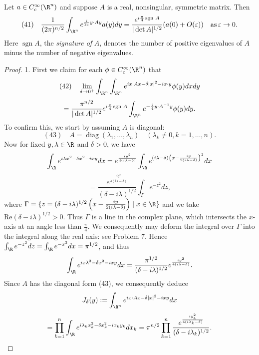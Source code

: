 \begin{lemma}
\label{lem:stationary-phase-quadratic-asymptotics}
Let $a \in C_c^\infty(\R^n)$ and suppose $A$ is a real, nonsingular, symmetric matrix. Then
$$(41) \quad \frac{1}{(2\pi)^{n/2}} \int_{\R^n} e^{\frac{i}{2\varepsilon}y \cdot A y} a(y) dy = \frac{e^{i\frac{\pi}{4}\operatorname{sgn}\,A}}{|\det A|^{1/2}} (a(0) + O(\varepsilon)) \quad \text{as}\, \varepsilon \to 0.$$
Here $\operatorname{sgn} A$, the \textit{signature of} $A$, denotes the number of positive eigenvalues of $A$ minus the number of negative eigenvalues.
\end{lemma}
\begin{proof}
1. First we claim for each $\phi \in C_c^\infty(\R^n)$ that
$$(42) \quad \lim_{\delta \to 0^+} \int_{\R^n} \int_{\R^n} e^{ix \cdot Ax - \delta|x|^2 - i x \cdot y} \phi(y) dx dy$$
$$= \frac{\pi^{n/2}}{|\det A|^{1/2}} e^{i\frac{\pi}{4}\operatorname{sgn}\,A} \int_{\R^n} e^{-\frac{i}{4}y \cdot A^{-1} y} \phi(y) dy.$$
To confirm this, we start by assuming $A$ is diagonal:
$$(43) \quad A = \operatorname{diag}(\lambda_1, \ldots, \lambda_n) \quad (\lambda_k \neq 0, k = 1, \ldots, n).$$
Now for fixed $y, \lambda \in \R$ and $\delta > 0$, we have
$$\int_{\R} e^{i \lambda x^2 - \delta x^2 - i x y} dx = e^{\frac{iy^2}{4(i\lambda - \delta)}} \int_{\R} e^{(i\lambda-\delta)\left(x - \frac{iy}{2(i\lambda-\delta)}\right)^2} dx$$
$$= \frac{e^{\frac{iy^2}{4(i\lambda - \delta)}}}{(\delta - i\lambda)^{1/2}} \int_{\Gamma} e^{-z^2} dz,$$
where $\Gamma = \{z = (\delta - i\lambda)^{1/2}\left(x - \frac{iy}{2(i\lambda-\delta)}\right) \mid x \in \R\}$ and we take $\text{Re}(\delta - i\lambda)^{1/2} > 0$. Thus $\Gamma$ is a line in the complex plane, which intersects the $x$-axis at an angle less than $\frac{\pi}{4}$. We consequently may deform the integral over $\Gamma$ into the integral along the real axis: see Problem 7. Hence $\int_{\R} e^{-z^2} dz = \int_{\R} e^{-x^2} dx = \pi^{1/2}$, and thus
$$\int_{\R} e^{ix\lambda^2 - \delta x^2 - ixy} dx = \frac{\pi^{1/2}}{(\delta - i\lambda)^{1/2}} e^{\frac{iy^2}{4(i\lambda - \delta)}}.$$
Since $A$ has the diagonal form (43), we consequently deduce
$$J_\delta(y) := \int_{\R^n} e^{ix \cdot Ax - \delta|x|^2 - ixy} dx$$
$$= \prod_{k=1}^{n} \int_{\R} e^{i\lambda_k x_k^2 - \delta x_k^2 - ix_k y_k} dx_k = \pi^{n/2} \prod_{k=1}^{n} \frac{e^{\frac{iy_k^2}{4(i\lambda_k - \delta)}}}{(\delta - i\lambda_k)^{1/2}}.$$


\end{proof}
